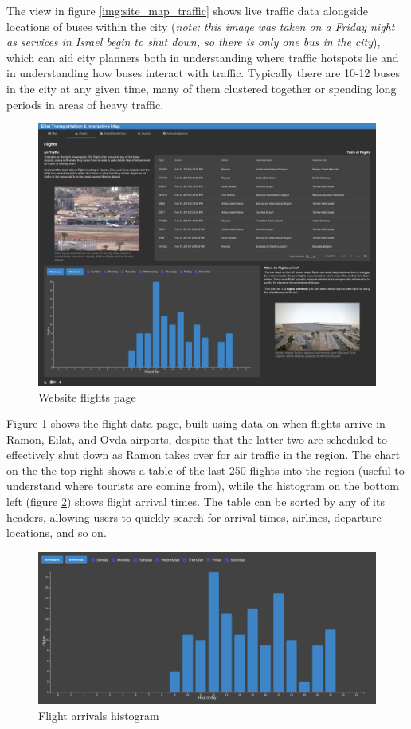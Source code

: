 \documentclass[12pt]{article}                       %
\begin{document}
The view in figure \ref{img:site_map_traffic} shows live traffic data alongside locations of buses within the city (\textit{note: this image was taken on a Friday night as services in Israel begin to shut down, so there is only one bus in the city}), which can aid city planners both in understanding where traffic hotspots lie and in understanding how buses interact with traffic. Typically there are 10-12 buses in the city at any given time, many of them clustered together or spending long periods in areas of heavy traffic.

\newpage
\begin{figure}[H]
    \centering
    \includegraphics[width=12cm]{images/site_flights.png}
    \caption{Website flights page}
    \label{img:site_flights}
\end{figure}

Figure \ref{img:site_flights} shows the flight data page, built using data on when flights arrive in Ramon, Eilat, and Ovda airports, despite that the latter two are scheduled to effectively shut down as Ramon takes over for air traffic in the region. The chart on the the top right shows a table of the last 250 flights into the region (useful to understand where tourists are coming from), while the histogram on the bottom left (figure \ref{img:site_flights_histogram}) shows flight arrival times. The table can be sorted by any of its headers, allowing users to quickly search for arrival times, airlines, departure locations, and so on.

\newpage
\begin{figure}[H]
    \centering
    \includegraphics[width=13cm]{images/site_flights_graph.png}
    \caption{Flight arrivals histogram}
    \label{img:site_flights_histogram}
\end{figure}
\end{document}
